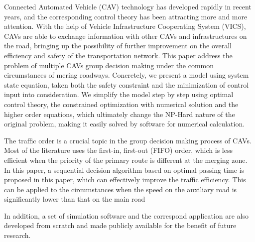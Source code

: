 
\begin{eabstract}
  Connected Automated Vehicle (CAV) technology has developed rapidly in recent years, and the corresponding control theory has been attracting more and more attention. With the help of Vehicle Infrastructure Cooperating System (VICS), CAVs are able to exchange information with other CAVs and infrastructures on the road, bringing up the possibility of further improvement on the overall efficiency and safety of the transportation network. This paper address the problem of multiple CAVs group decision making under the common circumstances of mering roadways. Concretely, we present a model using system state equation, taken both the safety constraint and the minimization of control input into consideration. We simplify the model step by step using optimal control theory, the constrained optimization with numerical solution and the higher order equations, which ultimately change the NP-Hard nature of the original problem, making it easily solved by software for numerical calculation.

  The traffic order is a crucial topic in the group decision making process of CAVs. Most of the literature uses the first-in, first-out (FIFO) order, which is less efficient when the priority of the primary route is different at the merging zone. In this paper, a sequential decision algorithm based on optimal passing time is proposed in this paper, which can effectively improve the traffic efficiency. This can be applied to the circumstances when the speed on the auxiliary road is significantly lower than that on the main road

  In addition, a set of simulation software and the correspond application are also developed from scratch and made publicly available for the benefit of future research.

\end{eabstract}

